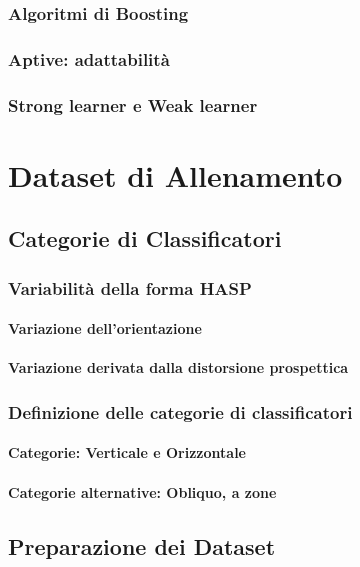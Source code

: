             \subsubsection{Algoritmi di Boosting}
            \subsubsection{Aptive: adattabilità}
            \subsubsection{Strong learner e Weak learner}
    \section{Dataset di Allenamento}
    \label{sec:training_dataset}
        \subsection{Categorie di Classificatori}
        \label{sub:classifiers_categories}
            \subsubsection{Variabilità della forma HASP}
                \paragraph{Variazione dell'orientazione}
                \paragraph{Variazione derivata dalla distorsione prospettica}
            \subsubsection{Definizione delle categorie di classificatori}
                \paragraph{Categorie: Verticale e Orizzontale}
                \paragraph{Categorie alternative: Obliquo, a zone}
        \subsection{Preparazione dei Dataset}
        \label{sub:datasets_setup}

